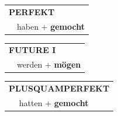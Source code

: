 \documentclass[10pt,a4paper]{revtex4-2}
\begin{document}
\begin{verbbox-modal}
    \vspace{10pt}
 
    \begin{tabular}{rl}
     \multicolumn{2}{l}{\textbf{PERFEKT}}\\
  &  haben + \textbf{gemocht}\\
  \end{tabular}
\hfill
   \begin{tabular}{rl}
   
    \multicolumn{2}{l}{\textbf{FUTURE I} }\\
  &  werden + \textbf{mögen}\\
 
  \end{tabular}
\hfill
   \begin{tabular}{rl}
      \multicolumn{2}{l}{\textbf{PLUSQUAMPERFEKT}}\\
   & hatten + \textbf{gemocht}\\
  \end{tabular}
  
  \vspace{-5pt}

\end{verbbox-modal}
\end{document}
